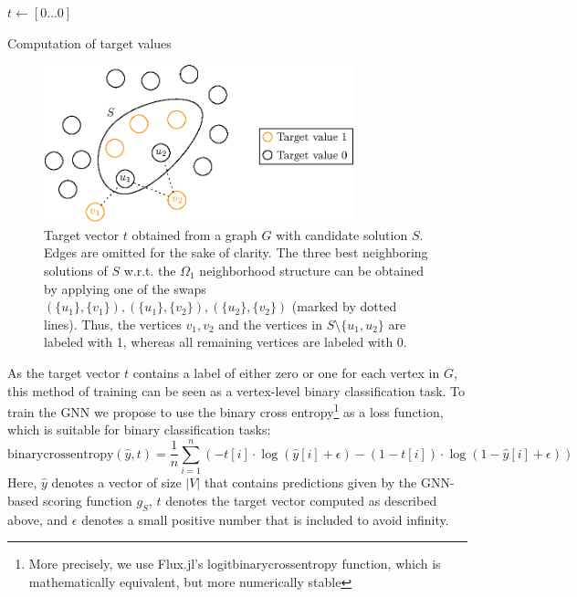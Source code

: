 \documentclass[draft,final]{vutinfth} %
\begin{document}

\begin{algorithm}
    \DontPrintSemicolon
    $t \gets [0 \dots 0]$ 
    \caption{Computation of target values}
    \label{alg:target-values}
\end{algorithm}

\begin{figure}
    \centering
    \includegraphics[width=0.8\textwidth]{graphics/target_values.eps}
    \caption[]{Target vector $t$ obtained from a graph $G$ with candidate solution $S$. Edges are omitted for the sake of clarity. The three best neighboring solutions of $S$ w.r.t. the $\Omega_1$ neighborhood structure can be obtained by applying one of the swaps $(\{u_1\}, \{v_1\}), (\{u_1\}, \{v_2\}), (\{u_2\}, \{v_2\})$ (marked by dotted lines). Thus, the vertices $v_1, v_2$ and the vertices in $S \setminus \{u_1, u_2\}$ are labeled with 1, whereas all remaining vertices are labeled with 0. }
    \label{fig:target-values}
\end{figure}

As the target vector $t$ contains a label of either zero or one for each vertex in $G$, this method of training can be seen as a vertex-level binary classification task. 
To train the GNN we propose to use the binary cross entropy\footnote{More precisely, we use Flux.jl's logitbinarycrossentropy function, which is mathematically equivalent, but more numerically stable} as a loss function, which is suitable for binary classification tasks:
\[
    \mathrm{binarycrossentropy}(\hat{y}, t) = \frac{1}{n} \sum_{i=1}^n(-t[i] \cdot \log(\hat{y}[i] + \epsilon) - (1 - t[i]) \cdot \log(1 - \hat{y}[i] + \epsilon))    
\]
Here, $\hat{y}$ denotes a vector of size $|V|$ that contains predictions given by the GNN-based scoring function $g_S$, $t$ denotes the target vector computed as described above, and $\epsilon$ denotes a small positive number that is included to avoid infinity. 
\end{document}
